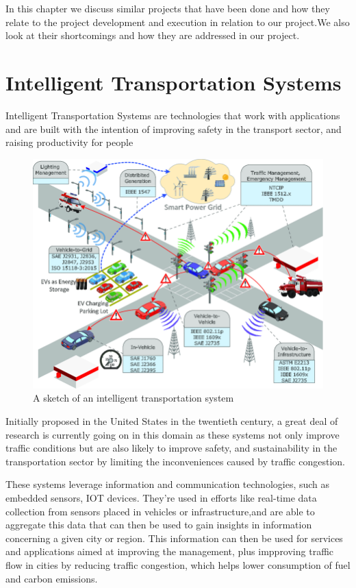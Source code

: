 In this chapter we discuss similar projects that have been done and how they relate to the project development and execution in relation to our project.We also look at their shortcomings and how they are addressed in our project.


\section{Intelligent Transportation Systems}
Intelligent Transportation Systems are technologies that work with applications and are built with the intention of improving safety in the transport sector, and raising productivity for people

\begin{figure}
    \begin{center}
        \includegraphics[scale = 0.3]{images/its}
        \caption{A sketch of an intelligent transportation system}
    \end{center}
\end{figure}
Initially proposed in the United States in the twentieth century, a great deal of research is currently going on in this domain as these systems not only improve traffic conditions but are also likely to improve safety, and sustainability in the transportation sector by limiting the inconveniences caused by traffic congestion\cite{i_meneguette_intelligent_2018}.

These systems leverage information and communication technologies, such as embedded sensors, IOT devices\cite{shaheen_intelligent_2004}. They’re used in efforts like real-time data collection from sensors placed in vehicles or infrastructure,and are able to aggregate this data that can then be used to gain insights in information concerning a given city or region. This information can then be used for services and applications aimed at improving the management, plus impproving traffic flow in cities by reducing traffic congestion, which helps lower consumption of fuel and carbon emissions\cite{i_meneguette_intelligent_2018}.

